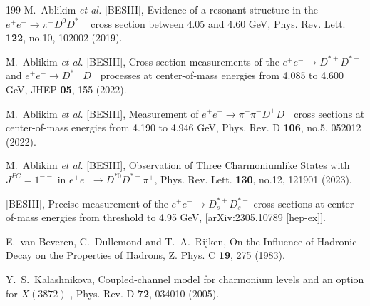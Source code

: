 \documentclass[prl,twocolumn,floatfix,amsmath,nofootinbib,amssymb,floatfix]{revtex4}
\begin{document}
\begin{thebibliography}{199}
M.~Ablikim \textit{et al.} [BESIII],
Evidence of a resonant structure in the $e^+e^-\to \pi^+D^0D^{*-}$ cross section between 4.05 and 4.60 GeV,
Phys. Rev. Lett. \textbf{122}, no.10, 102002 (2019).

M.~Ablikim \textit{et al.} [BESIII],
Cross section measurements of the $e^+e^-\to D^{*+}D^{*-}$ and $e^+e^-\to D^{*+}D^{-}$ processes at center-of-mass energies from 4.085 to 4.600 GeV,
JHEP \textbf{05}, 155 (2022).

M.~Ablikim \textit{et al.} [BESIII],
Measurement of $e^{+}e^{-}\rightarrow\pi^{+}\pi^{-}D^{+}D^{-}$ cross sections at center-of-mass energies from 4.190 to 4.946 GeV,
Phys. Rev. D \textbf{106}, no.5, 052012 (2022).

M.~Ablikim \textit{et al.} [BESIII],
Observation of Three Charmoniumlike States with $J^{PC}=1^{--}$ in $e^+e^-\to D^{*0}D^{*-}\pi^+$,
Phys. Rev. Lett. \textbf{130}, no.12, 121901 (2023).

 [BESIII],
Precise measurement of the $e^{+}e^{-}\rightarrow D_{s}^{\ast+}D_{s}^{\ast-}$ cross sections at center-of-mass energies from threshold to 4.95 GeV,
[arXiv:2305.10789 [hep-ex]].


E.~van Beveren, C.~Dullemond and T.~A.~Rijken,
On the Influence of Hadronic Decay on the Properties of Hadrons,
Z. Phys. C \textbf{19}, 275 (1983).




Y.~S.~Kalashnikova,
Coupled-channel model for charmonium levels and an option for $X(3872)$ ,
Phys. Rev. D \textbf{72}, 034010 (2005).



\end{thebibliography}
\end{document}
